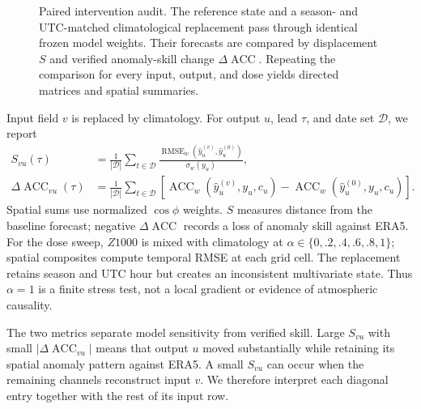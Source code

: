 \documentclass{article}
\newcommand{\rmse}{\operatorname{RMSE}}
\newcommand{\acc}{\operatorname{ACC}}
\begin{document}
\begin{figure}[t]
{}
\caption{Paired intervention audit. The reference state and a season- and UTC-matched climatological replacement pass through identical frozen model weights. Their forecasts are compared by displacement $S$ and verified anomaly-skill change $\Delta\acc$. Repeating the comparison for every input, output, and dose yields directed matrices and spatial summaries.}
\label{fig:method}
\end{figure}

Input field $v$ is replaced by climatology. For output $u$, lead $\tau$, and date set $\mathcal D$, we report
\begin{align}
S_{vu}(\tau)&=\frac{1}{|\mathcal D|}\sum_{t\in\mathcal D}
\frac{\rmse_w(\hat y_u^{(v)},\hat y_u^{(0)})}{\sigma_w(y_u)}, \\
\Delta\acc_{vu}(\tau)&=\frac{1}{|\mathcal D|}\sum_{t\in\mathcal D}
\left[\acc_w(\hat y_u^{(v)},y_u,c_u)-\acc_w(\hat y_u^{(0)},y_u,c_u)\right].
\end{align}
Spatial sums use normalized $\cos\phi$ weights. $S$ measures distance from the baseline forecast; negative $\Delta\acc$ records a loss of anomaly skill against ERA5. For the dose sweep, $Z1000$ is mixed with climatology at $\alpha\in\{0,.2,.4,.6,.8,1\}$; spatial composites compute temporal RMSE at each grid cell. The replacement retains season and UTC hour but creates an inconsistent multivariate state. Thus $\alpha=1$ is a finite stress test, not a local gradient or evidence of atmospheric causality.

The two metrics separate model sensitivity from verified skill. Large $S_{vu}$ with small $|\Delta\acc_{vu}|$ means that output $u$ moved substantially while retaining its spatial anomaly pattern against ERA5. A small $S_{vu}$ can occur when the remaining channels reconstruct input $v$. We therefore interpret each diagonal entry together with the rest of its input row.
\end{document}
